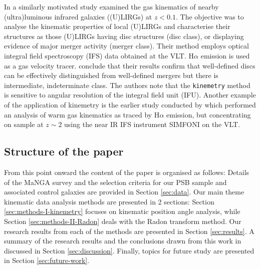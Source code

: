 In a similarly motivated study \citet{2016A&A...591A..85B} examined the gas kinematics of nearby (ultra)luminous infrared galaxies ((U)LIRGs) at $z<0.1$. The objective was to analyse the kinematic properties of local (U)LIRGs and characterise their structures as those (U)LIRGs having disc structures (disc class), or displaying evidence of major merger activity (merger class). Their method employs optical integral field spectroscopy (IFS) data obtained at the VLT. H$\alpha$ emission is used as a gas velocity tracer. \citet{2016A&A...591A..85B} conclude that their results confirm that well-defined discs can be effectively distinguished from well-defined mergers but there is intermediate, indeterminate class. The authors note that the \texttt{kinemetry} method is sensitive to angular resolution of the integral field unit (IFU). Another example of the application of kinemetry is the earlier study conducted by \citet{2008ApJ...682..231S} which performed an  analysis of warm gas kinematics as traced by H$\alpha$ emission, but concentrating on sample at $z\sim2$ using the near IR IFS instrument SIMFONI on the VLT.

\subsection{Structure of the paper}
From this point onward the content of the paper is organised as follows: Details of the MaNGA survey and the selection criteria for our PSB sample and associated control galaxies are provided in Section \ref{sec:data}. Our main theme kinematic data analysis methods are presented in 2 sections: Section \ref{sec:methods-I-kinemetry} focuses on kinematic position angle analysis, while Section \ref{sec:methods-II-Radon} deals with the Radon transform method. Our research results from each of the methods are presented in Section \ref{sec:results}. A summary of the research results and the conclusions drawn from this work in discussed in Section \ref{sec:discussion}. Finally, topics for future study are presented in Section \ref{sec:future-work}.
